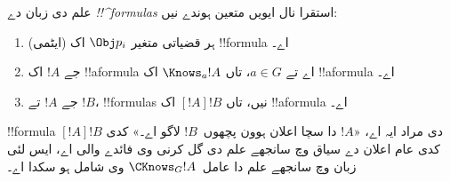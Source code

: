 \documentclass[../../../include/open-logic-section]{subfiles}
\begin{document}
\begin{defn}
علم دی زبان دے \emph{!!^{formula}s} استقرا نال ایویں متعین ہوندے نیں:
\begin{enumerate}


\item ہر قضیاتی متغیر $\Obj p_i$ اک (ایٹمی) !!{formula} اے۔






\item جے $!A$ اک !!a{formula} اے تے $a \in G$، تاں $\Knows_a !A$
  اک !!a{formula} اے۔

\item جے $!A$ تے $!B$، !!{formula}s نیں، تاں $[!A] !B$ اک !!a{formula} اے۔

\end{enumerate}
\end{defn}

!!{formula} $[!A] !B$ دی مراد ایہ اے، «$!A$ دا سچا اعلان ہوون
پچھوں~$!B$ لاگو اے۔» کدی کدی عام اعلان دے سیاق وچ سانجھے علم دی گل
کرنی وی فائدے والی اے، ایس لئی زبان وچ سانجھے علم دا عامل~$\CKnows_G
!A$ وی شامل ہو سکدا اے۔
\end{document}
